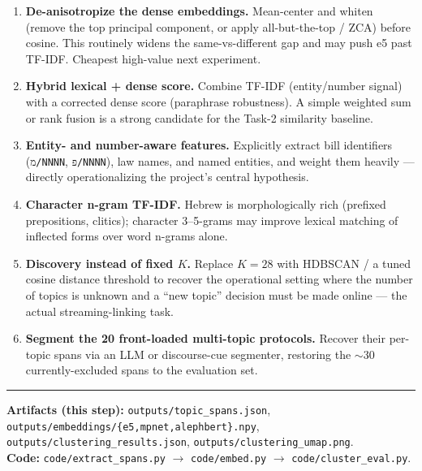 \documentclass[11pt,a4paper]{article}
\begin{document}
\begin{enumerate}[leftmargin=1.4em]
  \item \textbf{De-anisotropize the dense embeddings.} Mean-center and whiten (remove the top
    principal component, or apply all-but-the-top / ZCA) before cosine. This routinely widens the
    same-vs-different gap and may push e5 past TF-IDF. Cheapest high-value next experiment.
  \item \textbf{Hybrid lexical + dense score.} Combine TF-IDF (entity/number signal) with a
    corrected dense score (paraphrase robustness). A simple weighted sum or rank fusion is a
    strong candidate for the Task-2 similarity baseline.
  \item \textbf{Entity- and number-aware features.} Explicitly extract bill identifiers
    (\texttt{מ/NNNN}, \texttt{פ/NNNN}), law names, and named entities, and weight them heavily ---
    directly operationalizing the project's central hypothesis.
  \item \textbf{Character n-gram TF-IDF.} Hebrew is morphologically rich (prefixed prepositions,
    clitics); character 3--5-grams may improve lexical matching of inflected forms over word
    n-grams alone.
  \item \textbf{Discovery instead of fixed $K$.} Replace $K=28$ with HDBSCAN / a tuned cosine
    distance threshold to recover the operational setting where the number of topics is unknown
    and a ``new topic'' decision must be made online --- the actual streaming-linking task.
  \item \textbf{Segment the 20 front-loaded multi-topic protocols.} Recover their per-topic spans
    via an LLM or discourse-cue segmenter, restoring the ${\sim}30$ currently-excluded spans to the
    evaluation set.
\end{enumerate}

\vspace{1.5em}
\hrule
\vspace{0.4em}
{\small
\textbf{Artifacts (this step):}
\texttt{outputs/topic\_spans.json},
\texttt{outputs/embeddings/\{e5,mpnet,alephbert\}.npy},
\texttt{outputs/clustering\_results.json},
\texttt{outputs/clustering\_umap.png}.\\
\textbf{Code:} \texttt{code/extract\_spans.py} $\rightarrow$ \texttt{code/embed.py} $\rightarrow$ \texttt{code/cluster\_eval.py}.
}
\end{document}
